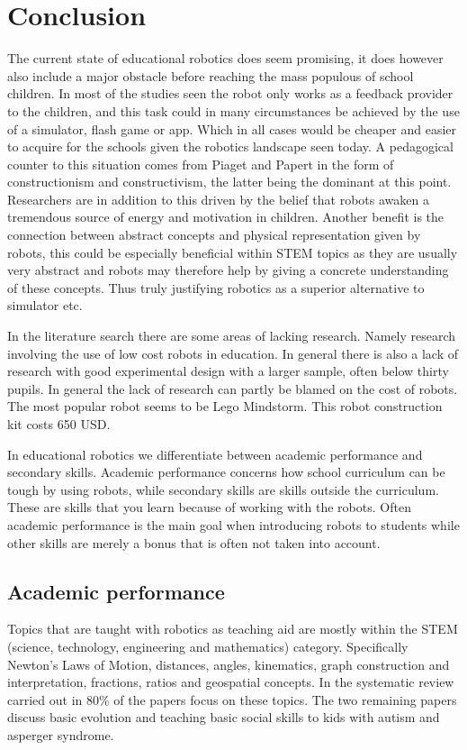 \section{Conclusion}
The current state of educational robotics does seem promising, it does however also include a major obstacle before reaching the mass populous of school children.
In most of the studies seen the robot only works as a feedback provider to the children, and this task could in many circumstances be achieved by the use of 
a simulator, flash game or app. Which in all cases would be cheaper and easier to acquire for the schools given the robotics landscape seen today.
A pedagogical counter to this situation comes from Piaget and Papert in the form of constructionism and constructivism, the latter being the dominant at this point. 
Researchers are in addition to this driven by the belief that robots awaken a tremendous source of energy and motivation in children. 
Another benefit is the connection between abstract concepts and physical representation given by robots, this could be especially beneficial within STEM topics as 
they are usually very abstract and robots may therefore help by giving a concrete understanding of these concepts. 
Thus truly justifying robotics as a superior alternative to simulator etc. 

\bigskip\noindent
In the literature search there are some areas of lacking research. Namely research involving the use of low cost robots in education. In general there is also a lack of research with good experimental design with a larger sample, often below thirty pupils. 
In general the lack of research can partly be blamed on the cost of robots. The most popular robot seems to be Lego Mindstorm. This robot construction kit costs 650 USD. 

\bigskip\noindent
In educational robotics we differentiate between academic performance and secondary skills. Academic performance concerns how school curriculum can be tough by using robots, while secondary skills are skills outside the curriculum. These are skills that you learn because of working with the robots. Often academic performance is the main goal when introducing robots to students while other skills are merely a bonus that is often not taken into account. 

\subsection{Academic performance}
Topics that are taught with robotics as teaching aid are mostly within the STEM (science, technology, engineering and mathematics) category. Specifically Newton's Laws of Motion, distances, angles, kinematics, graph construction and interpretation, fractions, ratios and geospatial concepts. In the systematic review carried out in \cite{Benitti2012978} 80\% of the papers focus on these topics. The two remaining papers discuss basic evolution and teaching basic social skills to kids with autism and asperger syndrome. 

